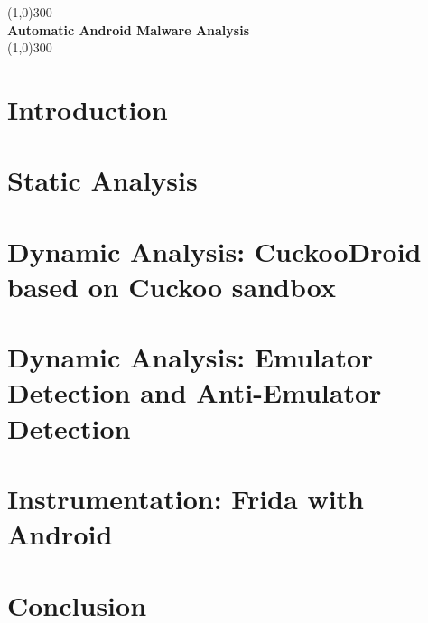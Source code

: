 \documentclass{article}
\begin{document}
	\begin{titlepage}
		\begin{center}
			\line(1,0){300}\\
			\huge{\bfseries Automatic Android Malware Analysis}\\
			\line(1,0){300}\\
		\end{center}
	\end{titlepage}
	
	\tableofcontents
	\cleardoublepage
	
	\section{Introduction}\label{sec:intro}
		
		\pagebreak
	\section{Static Analysis}\label{sec:static_analysis}
		
		\pagebreak
	\section{Dynamic Analysis: CuckooDroid based on Cuckoo sandbox}\label{sec:cuckoodroid}
		
		\pagebreak
	
	\section{Dynamic Analysis: Emulator Detection and Anti-Emulator Detection} \label{sec:Chp4}
		
		\pagebreak
	
	\section{Instrumentation: Frida with Android} \label{sec:Chp5}
		
		\pagebreak

	\section{Conclusion} \label{conclusion}
		
		\pagebreak


	
	
\end{document}
